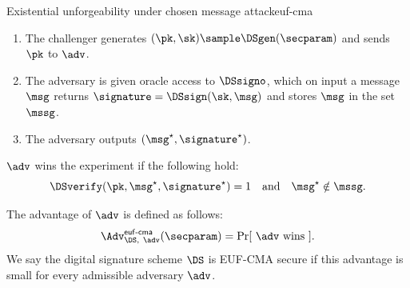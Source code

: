 \begin{experimentbox}{Existential unforgeability under chosen message
  attack}{euf-cma}

  \begin{enumerate}

    \item The challenger generates $(\pk,\sk) \sample \DSgen(\secparam)$ and
      sends $\pk$ to $\adv$.

    \item The adversary is given oracle access to $\DSsigno$, which on input a
      message $\msg$ returns $\signature = \DSsign(\sk, \msg)$ and stores
      $\msg$ in the set $\mssg$.

    \item The adversary outputs $(\msg^\star, \signature^\star)$.

  \end{enumerate}

  $\adv$ wins the experiment if the following hold:
  \begin{equation*}
    \DSverify(\pk,\msg^\star,\signature^\star) = 1 \quad\text{and}\quad
    \msg^\star \notin \mssg.
  \end{equation*}

\end{experimentbox}

The advantage of $\adv$ is defined as follows:
%
\begin{equation*}
%
  \Adv^{\mathsf{euf\text{-}cma}}_{\DS, \ \adv}(\secparam) = \Pr[ \ \adv\text{
  wins} \ ].
%
\end{equation*}
%
We say the digital signature scheme $\DS$ is EUF-CMA secure if this advantage
is small for every admissible adversary $\adv$.